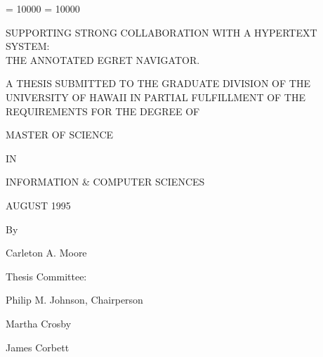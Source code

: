 
\clubpenalty = 10000    
\widowpenalty = 10000
\sloppy
\thispagestyle{empty}

\par\vspace*{0.00in}

\begin{center}
  SUPPORTING STRONG COLLABORATION WITH A HYPERTEXT SYSTEM:\\ 

  THE ANNOTATED EGRET NAVIGATOR.
\end{center}

\vspace*{0.6in}

  \begin{center}  
  A THESIS SUBMITTED TO THE GRADUATE DIVISION OF THE\\
  
  UNIVERSITY OF HAWAII IN PARTIAL FULFILLMENT OF THE\\
  
  REQUIREMENTS FOR THE DEGREE OF 
\end{center}

\begin{center}

  MASTER OF SCIENCE

 IN

 INFORMATION \& COMPUTER SCIENCES

 AUGUST 1995


\vspace*{0.7in}
 
  By   
  
  \vspace{.2in}
  
  Carleton A. Moore

  \vspace{0.2in}
\end{center}  

\begin{center}
  Thesis Committee:
  \vspace{0.2in}

  Philip M. Johnson, Chairperson

  Martha Crosby

  James Corbett

\end{center}  



